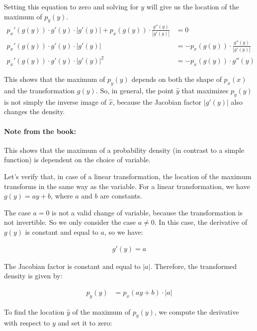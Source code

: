 \documentclass{article}
\begin{document}
\begin{tcolorbox}[breakable,colback=gray!5,colframe=gray!60,title=Solution]
Setting this equation to zero and solving for $y$ will give us the location of the maximum of $p_y(y)$.
\begin{align*}
  p_x'(g(y)) \cdot g'(y) \cdot \left| g'(y) \right| + p_x(g(y)) \cdot \frac{g''(y)}{\left| g'(y) \right|} &= 0 \\
  p_x'(g(y)) \cdot g'(y) \cdot \left| g'(y) \right| &= - p_x(g(y)) \cdot \frac{g''(y)}{\left| g'(y) \right|} \\
  p_x'(g(y)) \cdot g'(y) \cdot \left| g'(y) \right|^2 &= - p_x(g(y)) \cdot g''(y)
\end{align*}

This shows that the maximum of $p_y(y)$ depends on both the shape of $p_x(x)$ and the transformation $g(y)$. 
So, in general, the point $\hat{y}$ that maximizes $p_y(y)$ is not simply the inverse image of $\hat{x}$,
 because the Jacobian factor $\left| g'(y) \right|$ also changes the density.
\par\medskip

\paragraph{Note from the book:} This shows that the maximum of a probability density (in contrast to a simple 
function) is dependent on the choice of variable.
\par\medskip

Let's verify that, in case of a linear transformation, the location of the maximum transforms 
in the same way as the variable. 
For a linear transformation, we have $g(y) = ay + b$, where $a$ and $b$ are constants.

\par\medskip
The case $a = 0$ is not a valid change of variable, because the transformation is not invertible. 
So we only consider the case $a \neq 0$. In this case, the derivative of $g(y)$ is constant and equal 
to $a$, so we have:

\begin{align*}
  g'(y) = a
\end{align*}

The Jacobian factor is constant and equal to $|a|$. Therefore, the transformed density is given by:

\begin{align*}
  p_y(y) &= p_x(ay + b) \cdot |a|
\end{align*}

To find the location $\hat{y}$ of the maximum of $p_y(y)$, we compute the derivative with respect 
to $y$ and set it to zero:



\end{tcolorbox}
\end{document}
